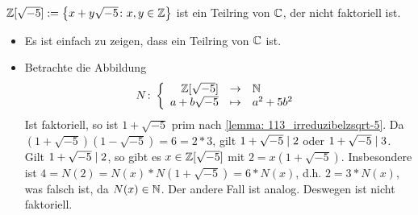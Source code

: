 \begin{exercisePage}
    \begin{exercise}
        $\mathbb{Z} [\sqrt{-5}] := \left\{ x+y\sqrt{-5} \colon x,y \in \mathbb{Z} \right\}$ ist ein Teilring von $\mathbb{C}$, der nicht faktoriell ist.
    \end{exercise}
    \begin{solution}
        \begin{itemize}[leftmargin=*]
            \item Es ist einfach zu zeigen, dass \zsqrt ein Teilring von $\mathbb{C}$ ist.
            \item Betrachte die Abbildung
            \begin{align} 
                N \colon \left\lbrace \begin{array}{rcl} \mathbb{Z} [\sqrt{-5}] & \to & \mathbb{N} \\a+b\sqrt{-5} & \mapsto & a^2+5b^2 \end{array} \right. \label{eq: 113_abbildung_gradfunktion}
            \end{align}
            Ist \zsqrt faktoriell, so ist $1 + \sqrt{-5}$ prim nach \cref{lemma: 113_irreduzibelzsqrt-5}. Da $\left( 1 + \sqrt{-5} \right) \left( 1 - \sqrt{-5} \right) = 6 = 2*3$, gilt $1 + \sqrt{-5} \mathrel{\mid} 2$ oder $1 + \sqrt{-5} \mathrel{\mid} 3$. Gilt $1 + \sqrt{-5} \mathrel{\mid} 2$, so gibt es $x \in \mathbb{Z} [\sqrt{-5}]$ mit $2 = x \left( 1 + \sqrt{-5} \right)$. Insbesondere ist $4 = N(2) = N(x) * N \left(1 + \sqrt{-5} \right) = 6 * N(x)$, d.h. $2 =  3*N(x)$, was falsch ist, da $N(x) \in \mathbb{N}$. Der andere Fall ist analog. Deswegen ist \zsqrt nicht faktoriell.
        \end{itemize}
    \end{solution}

    \pagebreak
    

\end{exercisePage}
